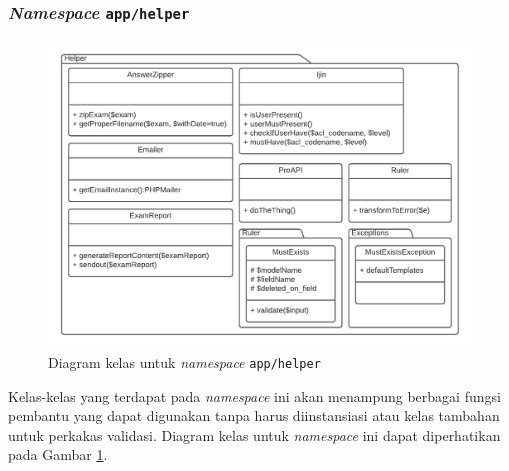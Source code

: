 \subsubsection{\textit{Namespace} \texttt{app/helper}}
    \begin{figure}
        \centering
        \includegraphics[width=0.75\paperwidth]{Gambar/classmap-be/Classmap - app-helper.pdf}
        \caption{Diagram kelas untuk \textit{namespace} \texttt{app/helper}}
        \label{fig:classmap_app-helper}
    \end{figure}
    Kelas-kelas yang terdapat pada \textit{namespace} ini akan menampung
    berbagai fungsi pembantu yang dapat digunakan tanpa harus diinstansiasi atau
    kelas tambahan untuk perkakas validasi. Diagram kelas untuk
    \textit{namespace} ini dapat diperhatikan pada Gambar
    \ref{fig:classmap_app-helper}.
    
